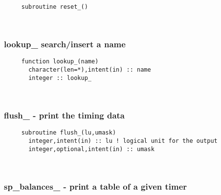 \begin{verbatim} 
     subroutine reset_()
 \end{verbatim}%
 
 
\mbox{}\hrulefill\ 
 
  \subsubsection{lookup\_ search/insert a name}

\begin{verbatim} 
     function lookup_(name)
       character(len=*),intent(in) :: name
       integer :: lookup_
 \end{verbatim}%
 
 
\mbox{}\hrulefill\ 
 
  \subsubsection{flush\_ - print the timing data}

\begin{verbatim} 
     subroutine flush_(lu,umask)
       integer,intent(in) :: lu	! logical unit for the output
       integer,optional,intent(in) :: umask
 \end{verbatim}%
 
 
\mbox{}\hrulefill\ 
 
  \subsubsection{sp\_balances\_ - print a table of a given timer}

